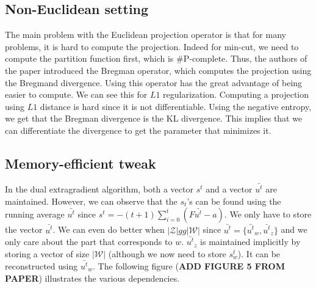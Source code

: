 \documentclass{article}
\begin{document}
\subsection{Non-Euclidean setting}
The main problem with the Euclidean projection operator is that for many problems, it is hard to compute the projection. Indeed for min-cut, we need to compute the partition function first, which is \#P-complete. Thus, the authors of the paper introduced the Bregman operator, which computes the projection using the Bregmand divergence. Using this operator has the great advantage of being easier to compute. We can see this for $L1$ regularization. Computing a projection using $L1$ distance is hard since it is not differentiable. Using the negative entropy, we get that the Bregman divergence is the KL divergence. This implies that we can differentiate the divergence to get the parameter that minimizes it.

\subsection{Memory-efficient tweak}
In the dual extragradient algorithm, both a vector $s^t$ and a vector $\bar{u^t}$ are maintained. However, we can observe that the $s_t$'s can be found using the running average $\bar{u^t}$ since $s^t = -(t + 1 ) \sum_{i=0}^t (F \bar{u^t} - a)$. We only have to store the vector $\bar{u^t}$. We can even do better when $|\mathcal{Z}| gg |\mathcal{W}|$ since $\bar{u^t} = \{ \bar{u^t}_w,\bar{u^t}_z \}$ and we only care about the part that corresponds to $w$. $\bar{u^t}_z$ is maintained implicitly by storing a vector of size $|\mathcal{W}|$ (although we now need to store $s_w^t$). It can be reconstructed using $\bar{u^t}_w$. The following figure (\textbf{ADD FIGURE 5 FROM PAPER}) illustrates the various dependencies.
\end{document}
